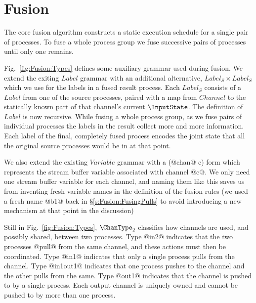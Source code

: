 
\chapter{Fusion}
\label{s:Fusion}

The core fusion algorithm constructs a static execution schedule for a single pair of processes. To fuse a whole process group we fuse successive pairs of processes until only one remains. 

Fig.~\ref{fig:Fusion:Types} defines some auxiliary grammar used during fusion. We extend the exiting $Label$ grammar with an additional alternative, $Label_S \times Label_S$ which we use for the labels in a fused result process. Each $Label_S$ consists of a $Label$ from one of the  source processes, paired with a map from $Channel$ to the statically known part of that channel's current $\InputState$. The definition of $Label$ is now recursive. While fusing a whole process group, as we fuse pairs of individual processes the labels in the result collect more and more information. Each label of the final, completely fused process encodes the joint state that all the original source processes would be in at that point.



We also extend the existing $Variable$ grammar with a (@chan@ c) form which represents the stream buffer variable associated with channel @c@. We only need one stream buffer variable for each channel, and naming them like this saves us from inventing fresh variable names in the definition of the fusion rules (we used a fresh name @b1@ back in \S\ref{s:Fusion:FusingPulls} to avoid introducing a new mechanism at that point in the discussion) 

Still in Fig.~\ref{fig:Fusion:Types}, $\ChanType_2$ classifies how channels are used, and possibly shared, between two processes. Type @in2@ indicates that the two processes @pull@ from the same channel, and these actions must then be coordinated. Type @in1@ indicates that only a single process pulls from the channel. Type @in1out1@ indicates that one process pushes to the channel and the other pulls from the same. Type @out1@ indicates that the channel is pushed to by a single process. Each output channel is uniquely owned and cannot be pushed to by more than one process.


